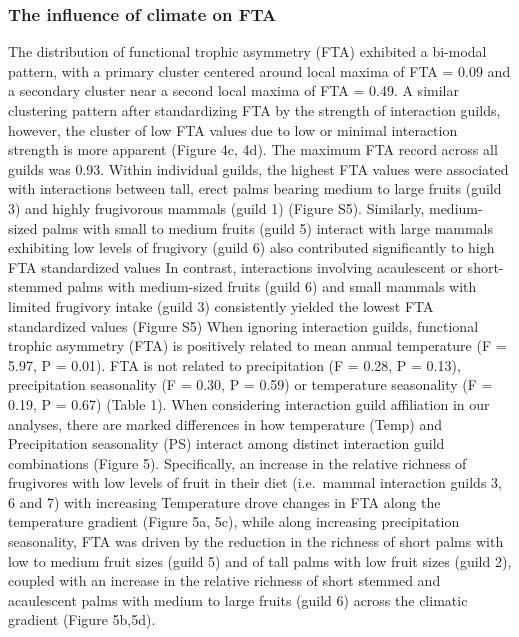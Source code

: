 \documentclass[
]{agujournal2019}
\begin{document}
\subsubsection{The influence of climate on
FTA}\label{the-influence-of-climate-on-fta}

The distribution of functional trophic asymmetry (FTA) exhibited a
bi-modal pattern, with a primary cluster centered around local maxima of
FTA = 0.09 and a secondary cluster near a second local maxima of FTA =
0.49. A similar clustering pattern after standardizing FTA by the
strength of interaction guilds, however, the cluster of low FTA values
due to low or minimal interaction strength is more apparent (Figure 4c,
4d). The maximum FTA record across all guilds was 0.93. Within
individual guilds, the highest FTA values were associated with
interactions between tall, erect palms bearing medium to large fruits
(guild 3) and highly frugivorous mammals (guild 1) (Figure S5).
Similarly, medium-sized palms with small to medium fruits (guild 5)
interact with large mammals exhibiting low levels of frugivory (guild 6)
also contributed significantly to high FTA standardized values In
contrast, interactions involving acaulescent or short-stemmed palms with
medium-sized fruits (guild 6) and small mammals with limited frugivory
intake (guild 3) consistently yielded the lowest FTA standardized values
(Figure S5) When ignoring interaction guilds, functional trophic
asymmetry (FTA) is positively related to mean annual temperature (F =
5.97, P = 0.01). FTA is not related to precipitation (F = 0.28, P =
0.13), precipitation seasonality (F = 0.30, P = 0.59) or temperature
seasonality (F = 0.19, P = 0.67) (Table 1). When considering interaction
guild affiliation in our analyses, there are marked differences in how
temperature (Temp) and Precipitation seasonality (PS) interact among
distinct interaction guild combinations (Figure 5). Specifically, an
increase in the relative richness of frugivores with low levels of fruit
in their diet (i.e.~mammal interaction guilds 3, 6 and 7) with
increasing Temperature drove changes in FTA along the temperature
gradient (Figure 5a, 5c), while along increasing precipitation
seasonality, FTA was driven by the reduction in the richness of short
palms with low to medium fruit sizes (guild 5) and of tall palms with
low fruit sizes (guild 2), coupled with an increase in the relative
richness of short stemmed and acaulescent palms with medium to large
fruits (guild 6) across the climatic gradient (Figure 5b,5d).
\end{document}

